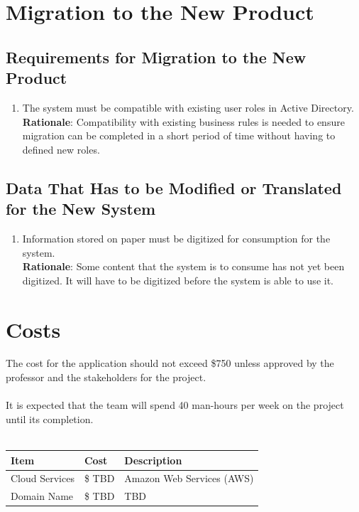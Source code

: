 \documentclass[12pt]{article}
\begin{document}
\section{Migration to the New Product}
\subsection{Requirements for Migration to the New Product}
\begin{enumerate} [{MI-NP}1.]
  \item The system must be compatible with existing user roles in Active
    Directory.\\
    \textbf{Rationale}: Compatibility with existing business rules is needed
    to ensure migration can be completed in a short period of time without
    having to defined new roles.
\end{enumerate}

\subsection{Data That Has to be Modified or Translated for the New System}
\begin{enumerate} [{MI-TR}1.]
  \item Information stored on paper must be digitized for consumption for the
    system.\\
    \textbf{Rationale}: Some content that the system is to consume has not yet
    been digitized. It will have to be digitized before the system is able to
    use it.
\end{enumerate}

\section{Costs}
The cost for the application should not exceed \$750 unless approved
by the professor and the stakeholders for the project.\\
\\
It is expected that the team will spend 40 man-hours per week on the
project until its completion.\\
\\
\begin{tabularx}{\textwidth}{p{3cm}p{2cm}X}
  \toprule {\textbf{Item}} & {\textbf{Cost}} & {\textbf{Description}}\\
  \midrule
  Cloud Services   & \$ TBD     & Amazon Web Services (AWS) \\
  Domain Name      & \$ TBD     & TBD           \\
  \bottomrule
\end{tabularx}
\end{document}
